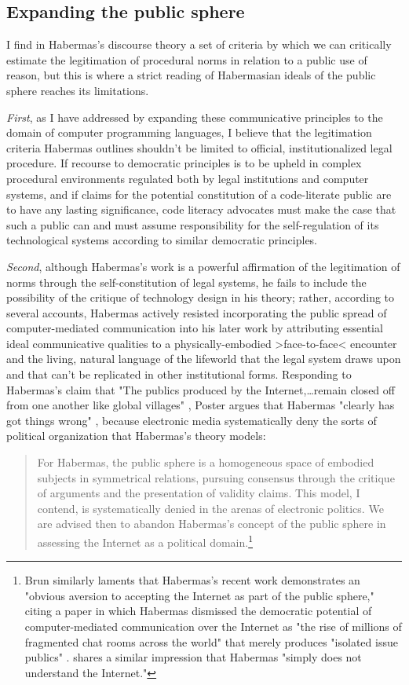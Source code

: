 \subsection*{Expanding the public sphere}
I find in Habermas's discourse theory a set of criteria by which we can critically estimate the legitimation of procedural norms in relation to a public use of reason, but this is where a strict reading of Habermasian ideals of the public sphere reaches its limitations.

\emph{First}, as I have addressed by expanding these communicative principles to the domain of computer programming languages, I believe that the legitimation criteria Habermas outlines shouldn't be limited to official, institutionalized legal procedure. If recourse to democratic principles is to be upheld in complex procedural environments regulated both by legal institutions and computer systems, and if claims for the potential constitution of a code-literate public are to have any lasting significance, code literacy advocates must make the case that such a public can and must assume responsibility for the self-regulation of its technological systems according to similar democratic principles.

\emph{Second}, although Habermas's work is a powerful affirmation of the legitimation of norms through the self-constitution of legal systems, he fails to include the possibility of the critique of technology design in his theory; rather, according to several accounts, Habermas actively resisted incorporating the public spread of computer-mediated communication into his later work by attributing essential ideal communicative qualities to a physically-embodied >face-to-face< encounter and the living, natural language of the lifeworld that the legal system draws upon and that can't be replicated in other institutional forms. Responding to Habermas's claim that "The publics produced by the Internet,…remain closed off from one another like global villages" \autocite[qtd.~in][116]{Poster01}, Poster argues that Habermas "clearly has got things wrong" \autocite[116]{Poster01}, because electronic media systematically deny the sorts of political organization that Habermas's theory models:
\blockcquote[181--2]{Poster01}{
  For Habermas, the public sphere is a homogeneous space of embodied subjects in symmetrical relations, pursuing consensus through the critique of arguments and the presentation of validity claims. This model, I contend, is systematically denied in the arenas of electronic politics. We are advised then to abandon Habermas's concept of the public sphere in assessing the Internet as a political domain.\footnote{
    Brun similarly laments that Habermas's recent work demonstrates an "obvious aversion to accepting the Internet as part of the public sphere," citing a paper in which Habermas dismissed the democratic potential of computer-mediated communication over the Internet as "the rise of millions of fragmented chat rooms across the world" that merely produces "isolated issue publics" \mancite\autocite[qtd.~in][]{Brun07}. \citeauthor{Rheingold07} shares a similar impression that Habermas "simply does not understand the Internet."
  }
}

